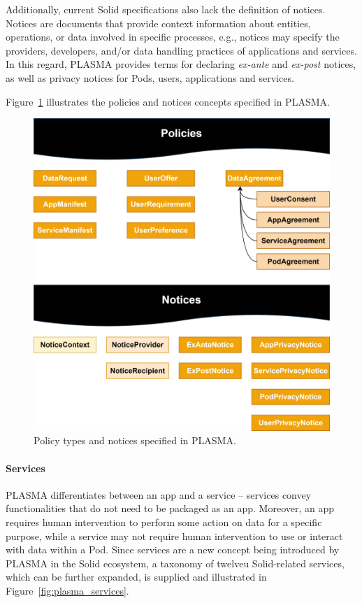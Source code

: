 Additionally, current Solid specifications also lack the definition of notices.
Notices are documents that provide context information about entities, operations, or data involved in specific processes, e.g., notices may specify the providers, developers, and/or data handling practices of applications and services. 
In this regard, PLASMA provides terms for declaring \textit{ex-ante} and \textit{ex-post} notices, as well as privacy notices for Pods, users, applications and services.

Figure~\ref{fig:plasma_policies} illustrates the policies and notices concepts specified in PLASMA.

\begin{figure}[htb]
    \centering
    \includegraphics[width=0.8\linewidth]{figures/chapter-4/policies_notices.png}
    \caption{Policy types and notices specified in PLASMA.}
    \label{fig:plasma_policies}
\end{figure}

\paragraph{Services}
PLASMA differentiates between an app and a service -- services convey functionalities that do not need to be packaged as an app.
Moreover, an app requires human intervention to perform some action on data for a specific purpose, while a service may not require human intervention to use or interact with data within a Pod.
Since services are a new concept being introduced by PLASMA in the Solid ecosystem, a taxonomy of twelveu Solid-related services, which can be further expanded, is supplied and illustrated in Figure~\ref{fig:plasma_services}.

